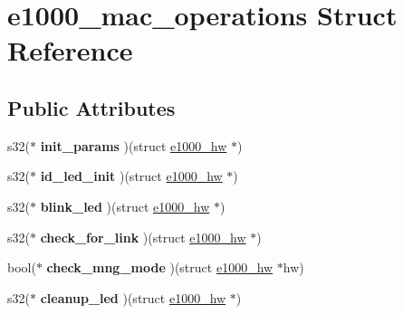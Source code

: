 \hypertarget{structe1000__mac__operations}{
\section{e1000\_\-mac\_\-operations Struct Reference}
\label{structe1000__mac__operations}
}
\subsection*{Public Attributes}
\begin{DoxyCompactItemize}
\item 
\hypertarget{structe1000__mac__operations_aef4969c0596b3ac799a491f633402d6c}{
s32($\ast$ {\bfseries init\_\-params} )(struct \hyperlink{structe1000__hw}{e1000\_\-hw} $\ast$)}
\label{structe1000__mac__operations_aef4969c0596b3ac799a491f633402d6c}

\item 
\hypertarget{structe1000__mac__operations_ae2d1ca80886c6f64df65328b47158b0a}{
s32($\ast$ {\bfseries id\_\-led\_\-init} )(struct \hyperlink{structe1000__hw}{e1000\_\-hw} $\ast$)}
\label{structe1000__mac__operations_ae2d1ca80886c6f64df65328b47158b0a}

\item 
\hypertarget{structe1000__mac__operations_a2441f5cdaa5e13268871676089c4cbe9}{
s32($\ast$ {\bfseries blink\_\-led} )(struct \hyperlink{structe1000__hw}{e1000\_\-hw} $\ast$)}
\label{structe1000__mac__operations_a2441f5cdaa5e13268871676089c4cbe9}

\item 
\hypertarget{structe1000__mac__operations_a333d0d20f9d7f8b6ee6f2a7f4e78f8a3}{
s32($\ast$ {\bfseries check\_\-for\_\-link} )(struct \hyperlink{structe1000__hw}{e1000\_\-hw} $\ast$)}
\label{structe1000__mac__operations_a333d0d20f9d7f8b6ee6f2a7f4e78f8a3}

\item 
\hypertarget{structe1000__mac__operations_a61ab1fe9783a093478426f7a0b154d5e}{
bool($\ast$ {\bfseries check\_\-mng\_\-mode} )(struct \hyperlink{structe1000__hw}{e1000\_\-hw} $\ast$hw)}
\label{structe1000__mac__operations_a61ab1fe9783a093478426f7a0b154d5e}

\item 
\hypertarget{structe1000__mac__operations_a9fd7504bcac3fd76704d13ae5131f498}{
s32($\ast$ {\bfseries cleanup\_\-led} )(struct \hyperlink{structe1000__hw}{e1000\_\-hw} $\ast$)}
\label{structe1000__mac__operations_a9fd7504bcac3fd76704d13ae5131f498}


\end{DoxyCompactItemize}
